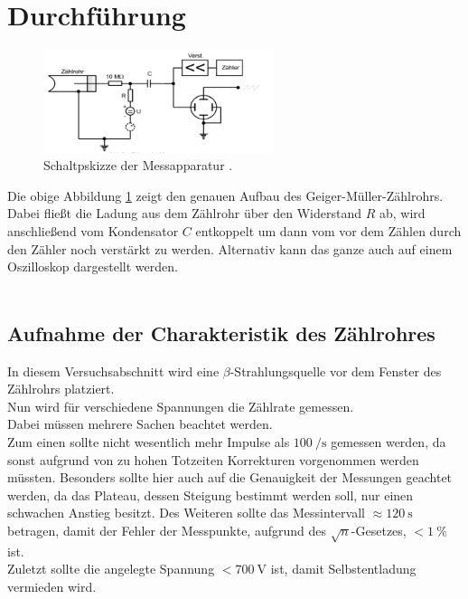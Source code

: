 \newpage
\section{Durchführung}

\begin{figure}[H]
    \centering
    \includegraphics[width=0.6\textwidth]{images/schaltplan.PNG}
    \caption{Schaltpskizze der Messapparatur \protect \cite{V703}.}
    \label{img:schalt}
\end{figure}
Die obige Abbildung \ref{img:schalt} zeigt den genauen Aufbau des Geiger-Müller-Zählrohrs. Dabei fließt die Ladung aus dem Zählrohr über den Widerstand $R$ ab, 
wird anschließend vom Kondensator $C$ entkoppelt um dann vom vor dem Zählen durch den Zähler noch verstärkt zu werden. Alternativ kann das ganze auch auf einem Oszilloskop dargestellt werden.\\\\

\subsection{Aufnahme der Charakteristik des Zählrohres}


\noindent
In diesem Versuchsabschnitt wird eine $\beta$-Strahlungsquelle vor dem Fenster des Zählrohrs platziert.\\
Nun wird für verschiedene Spannungen die Zählrate gemessen.\\
Dabei müssen mehrere Sachen beachtet werden.\\
Zum einen sollte nicht wesentlich mehr Impulse als $\SI{100}{\per\second}$ gemessen werden, da sonst aufgrund von zu hohen Totzeiten Korrekturen vorgenommen werden müssten.
Besonders sollte hier auch auf die Genauigkeit der Messungen geachtet werden, da das Plateau, dessen Steigung bestimmt werden soll, nur einen schwachen Anstieg besitzt.
Des Weiteren sollte das Messintervall $\approx\SI{120}{\second}$ betragen, damit der Fehler der Messpunkte, aufgrund des $\sqrt{n}$-Gesetzes, $<\SI{1}{\percent}$ ist.\\
Zuletzt sollte die angelegte Spannung $<\SI{700}{\volt}$ ist, damit Selbstentladung vermieden wird.\\\\

